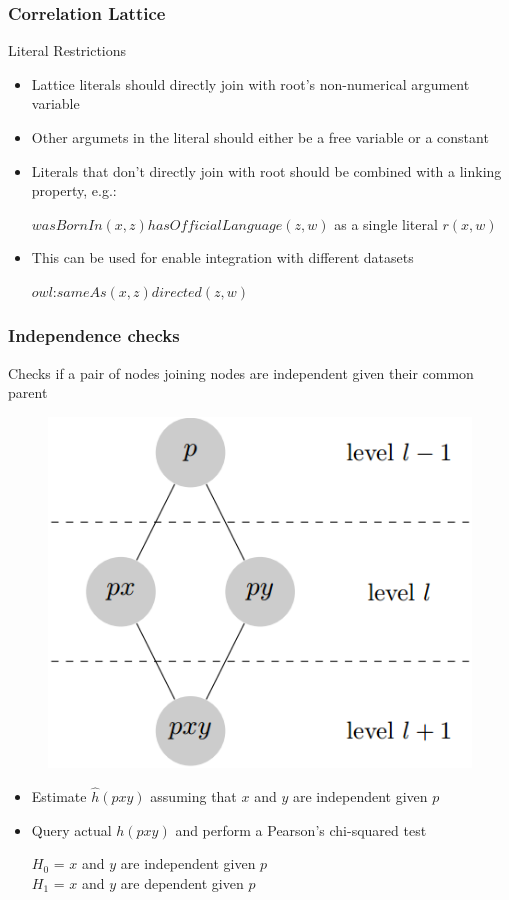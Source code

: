 \documentclass{beamer}
\begin{document}
\begin{frame}
\frametitle{Correlation Lattice}
  Literal Restrictions
  \begin{itemize}
    \item Lattice literals should directly join with root's non-numerical argument variable
    \item Other argumets in the literal should either be a free variable or a constant
    \item Literals that don't directly join with root should be combined with a linking property, e.g.:
       \begin{center}
	  $wasBornIn(x,z)hasOfficialLanguage(z,w)$ as a single literal $r(x,w)$
       \end{center}

    \item This can be used for enable integration with different datasets
    \begin{center}
       $owl$:$sameAs(x,z)directed(z,w)$
    \end{center}
  \end{itemize}
\end{frame}

\begin{frame}
\frametitle{Independence checks}
  Checks if a pair of nodes joining nodes are independent given their common parent
  \begin{figure}
  \includegraphics[height=0.3\textheight]{./Figures/indep}
  \end{figure}
  \begin{itemize}
    \item Estimate $\hat{h}(pxy)$ assuming that $x$ and $y$ are independent given $p$
    \item Query actual $h(pxy)$ and perform a Pearson's chi-squared test
      \begin{center}
	  $H_0$ = $x$ and $y$ are independent given $p$ \\
	  $H_1$ = $x$ and $y$ are dependent given $p$
      \end{center}
  \end{itemize}
\end{frame}
\end{document}
